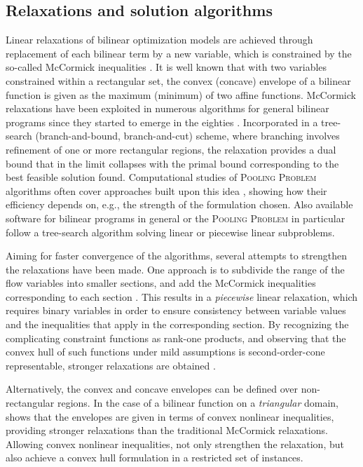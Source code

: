 \documentclass[pdflatex,sn-mathphys-num]{sn-jnl}%
\theoremstyle{thmstyleone}%
\begin{document}
\subsection{Relaxations and solution algorithms} \label{sec:relax}

Linear relaxations of bilinear optimization models are achieved through replacement of each bilinear term by a new variable,
which is constrained by the so-called McCormick inequalities \cite{mccormick76}.
It is well known \cite{mccormick76} that with two variables constrained within a rectangular set,
the convex (concave) envelope of a bilinear function is given as the maximum (minimum) of two affine functions.
McCormick relaxations have been exploited in numerous algorithms for general bilinear programs since they started to
emerge in the eighties \cite{alkhayyal83,alkhayyal90}.
Incorporated in a tree-search (branch-and-bound, branch-and-cut) scheme, where branching involves refinement of one or more rectangular regions,
the relaxation provides a dual bound that in the limit collapses with the primal bound corresponding to the best feasible solution found.
Computational studies of \textsc{Pooling Problem} algorithms often cover approaches built upon this idea
\cite{foulds92,bental94,quesada95,audet04,misener09,misener10,misener11,alfaki13a,alfaki13b,boland16},
showing how their efficiency depends on, e.g., the strength of the formulation chosen. 
Also available software for bilinear programs in general \cite{tawarmalani04,gurobi26}
or the \textsc{Pooling Problem} in particular \cite{misener11,ceccon22} follow a tree-search algorithm
solving linear or piecewise linear subproblems.

Aiming for faster convergence of the algorithms, several attempts to strengthen the relaxations have been made.
One approach is to subdivide the range of the flow variables into smaller sections,
and add the McCormick inequalities corresponding to each section \cite{meyer06,wicaksono08,gounaris09,pham09,misener11,dey15,gupte17}.
This results in a \emph{piecewise} linear relaxation,
which requires binary variables in order to ensure consistency between
variable values and the inequalities that apply in the corresponding section.
By recognizing the complicating constraint functions as rank-one products,
and observing that the convex hull of such functions under mild assumptions is second-order-cone representable,
stronger relaxations are obtained \cite{dey20,jalilian26}.

Alternatively, the convex and concave envelopes can be defined over non-rectangular regions.
In the case of a bilinear function on a \emph{triangular} 
domain, \citet{linderoth05} shows that the envelopes are given in terms of convex nonlinear inequalities,
providing stronger relaxations than the traditional McCormick relaxations.
Allowing convex nonlinear inequalities, \citet{luedtke20} not only strengthen the relaxation,
but also achieve a convex hull formulation in a restricted set of instances.
\end{document}
